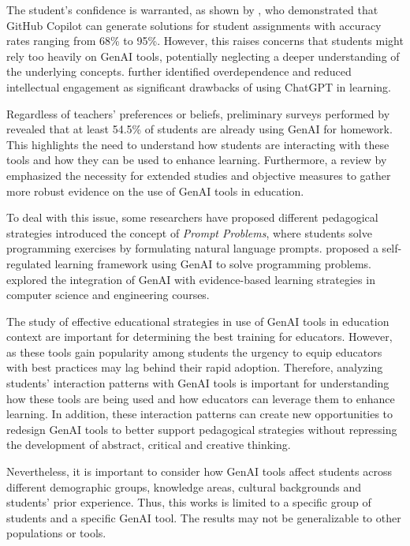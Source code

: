 \documentclass[a4paper,twoside]{article}
\begin{document}
The student's confidence is warranted, as shown by \cite{Puryear22}, who
demonstrated that GitHub Copilot can generate solutions for student assignments
with accuracy rates ranging from 68\% to 95\%. However, this raises concerns that
students might rely too heavily on GenAI tools, potentially neglecting a deeper
understanding of the underlying concepts. \cite{cai23} further identified
overdependence and reduced intellectual engagement as significant drawbacks of
using ChatGPT in learning.

Regardless of teachers' preferences or beliefs, preliminary surveys
performed by \cite{Dickey24} revealed that at least 54.5\% of students are
already using GenAI for homework. This highlights the need to understand how
students are interacting with these tools and how they can be used to enhance
learning. Furthermore, a review by \cite{Lo24} emphasized the necessity for
extended studies and objective measures to gather more robust evidence on the
use of GenAI tools in education.


To deal with this issue, some researchers have proposed different pedagogical
strategies \cite{Denny24} introduced the concept of \textit{Prompt
Problems}, where students solve programming exercises by formulating natural
language prompts. \cite{Prasad24} proposed a self-regulated learning framework
using GenAI to solve programming problems. \cite{Lauren23} explored the
integration of GenAI with evidence-based learning strategies in computer science
and engineering courses.


The study of effective educational strategies in use of GenAI tools in education
context are important for determining the best training for educators. However,
as these tools gain popularity among students \cite{Dickey24} the urgency to
equip educators with best practices may lag behind their rapid adoption.
Therefore, analyzing students' interaction patterns with GenAI tools is
important for understanding how these tools are being used and how educators can
leverage them to enhance learning. In addition, these interaction patterns can
create new opportunities to redesign GenAI tools to better support pedagogical
strategies without repressing the development of abstract, critical and creative
thinking.


Nevertheless, it is important to consider how GenAI tools affect students across
different demographic groups, knowledge areas, cultural backgrounds
\cite{catalan21} \cite{neo22} and students' prior experience. Thus, this works
is limited to a specific group of students and a specific GenAI tool. The
results may not be generalizable to other populations or tools.
\end{document}
